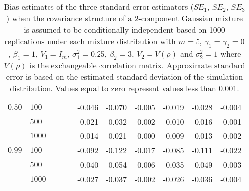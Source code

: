 \documentclass[10pt]{article}
\begin{document}
\begin{table}[ht]
\begin{center}
\begin{tabular}{llccccccccc}
  $0.50$ & $100$ &   &   &   & -0.046 & -0.070 & -0.005 & -0.019 & -0.028 & -0.004 \\ 
    & $500$ &   &   &   & -0.021 & -0.032 & -0.002 & -0.010 & -0.016 & -0.001 \\ 
    & $1000$ &   &   &   & -0.014 & -0.021 & -0.000 & -0.009 & -0.013 & -0.002 \\ 
  $0.99$ & $100$ &   &   &   & -0.092 & -0.122 & -0.017 & -0.085 & -0.111 & -0.022 \\ 
    & $500$ &   &   &   & -0.040 & -0.054 & -0.006 & -0.035 & -0.049 & -0.003 \\ 
    & $1000$ &   &   &   & -0.027 & -0.037 & -0.002 & -0.026 & -0.036 & -0.004 \\ 
   \hline\end{tabular}
\caption{Bias estimates of the three standard error estimators ($SE_1$, $SE_2$, $SE_3$) when the covariance structure of a 2-component Gaussian mixture is assumed to be conditionally independent based on 1000 replications under each mixture distribution with $m=5$, $\gamma_1=\gamma_2=0$, $\beta_{1}=1$, $V_1=I_{m}$, $\sigma_1^{2}=0.25$, $\beta_2=3$, $V_2=V(\rho)$ and $\sigma_2^{2}=1$ where $V(\rho)$ is the exchangeable correlation matrix. Approximate standard error is based on the estimated standard deviation of the simulation distribution. Values equal to zero represent values less than 0.001.}
\label{tab:dep2}
\end{center}
\end{table}\clearpage
\end{document}
